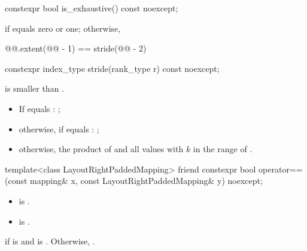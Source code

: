 %
\begin{itemdecl}
constexpr bool is_exhaustive() const noexcept;
\end{itemdecl}

\begin{itemdescr}
\pnum
\returns
{} if  equals zero or one;
otherwise,
\begin{codeblock}
@@.extent(@@ - 1) == stride(@@ - 2)
\end{codeblock}
\end{itemdescr}

\begin{itemdecl}
constexpr index_type stride(rank_type r) const noexcept;
\end{itemdecl}

\begin{itemdescr}
\pnum
\expects
{} is smaller than .

\pnum
\returns
\begin{itemize}
\item
If  equals : ;
\item
otherwise, if  equals : ;
\item
otherwise,
the product of  and
all values 
with $k$ in the range of .
\end{itemize}
\end{itemdescr}

%
\begin{itemdecl}
template<class LayoutRightPaddedMapping>
  friend constexpr bool operator==(const mapping& x, const LayoutRightPaddedMapping& y) noexcept;
\end{itemdecl}

\begin{itemdescr}
\pnum
\constraints
\begin{itemize}
\item
{}
is .
\item
{}
is .
\end{itemize}

\pnum
\returns
{} if  is  and
 is .
Otherwise, .
\end{itemdescr}

